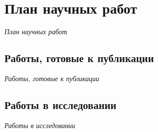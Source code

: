 \section{План научных работ}
\begin{frame}
    \centering \Large
  \emph{План научных работ}
\end{frame}

\subsection{Работы, готовые к публикации}
\begin{frame}
    \centering \Large
  \emph{Работы, готовые к публикации}
\end{frame}	

\subsection{Работы в исследовании}	
\begin{frame}
    \centering \Large
  \emph{Работы в исследовании}
\end{frame}
